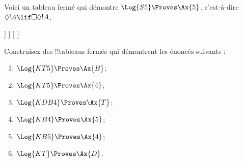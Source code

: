 \documentclass[../../../include/open-logic-section]{subfiles}
\begin{document}
\begin{ex}
  Voici un tableau fermé qui démontre $\Log{S5} \Proves \Ax{5}$,
  c'est-à-dire $\Diamond!A \lif \Box\Diamond!A$.
  \begin{oltableau}
    [\pFmla{\False}{\Diamond\formula{A} \lif \Box\Diamond \formula{A}}{1},
      just = \TAss
      [\pFmla{\True}{\Diamond \formula{A}}{1}, just = {\TRule{\False}{\lif}[1]}
        [\pFmla{\False}{\Box\Diamond \formula{A}}{1},
          just = {\TRule{\False}{\lif}[1]}
          [\pFmla{\False}{\Diamond \formula{A}}{1.1},
            just = {\TRule{\False}{\Box}[3]}
            [\pFmla{\False}{\Diamond \formula{A}}{1},
              just = {4r$\Diamond$ 4}, close]
          ]
        ]
      ]
    ]
  \end{oltableau}
\end{ex}

\begin{prob}
Construisez des !!{tableau}s fermés qui démontrent les énoncés suivants :
  \begin{enumerate}
  \item $\Log{KT5} \Proves \Ax{B}$;
  \item $\Log{KT5} \Proves \Ax{4}$;
  \item $\Log{KDB4} \Proves \Ax{T}$;
  \item $\Log{KB4} \Proves \Ax{5}$;
  \item $\Log{KB5} \Proves \Ax{4}$;
  \item $\Log{KT} \Proves \Ax{D}$.
  \end{enumerate}
\end{prob}
\end{document}
